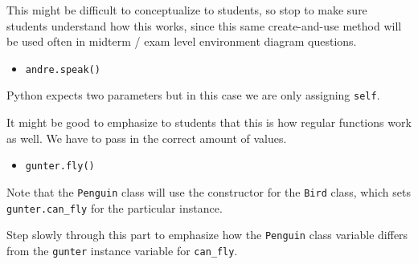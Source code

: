 \begin{guide}
\begin{blocksection}
This might be difficult to conceptualize to students, so stop to make sure students understand how this works, since this same create-and-use method will be used often in midterm / exam level environment diagram questions.
\end{blocksection}
\end{guide}

\begin{solution}
\begin{blocksection}
\begin{itemize}
    \item \lstinline{andre.speak()}
\end{itemize}
Python expects two parameters but in this case we are only assigning \lstinline{self}.
\end{blocksection}
\end{solution}

\begin{guide}
\begin{blocksection}
It might be good to emphasize to students that this is how regular functions work as well. We have to pass in the correct amount of values.
\end{blocksection}
\end{guide}

\begin{solution}
\begin{blocksection}
\begin{itemize}
    \item \lstinline{gunter.fly()}
\end{itemize}
Note that the \lstinline{Penguin} class will use the constructor for the \lstinline{Bird} class, which sets \lstinline{gunter.can_fly} for the particular instance.
\end{blocksection}
\end{solution}

\begin{guide}
\begin{blocksection}
Step slowly through this part to emphasize how the \lstinline{Penguin} class variable differs from the \lstinline{gunter} instance variable for \lstinline{can_fly}.
\end{blocksection}
\end{guide}

